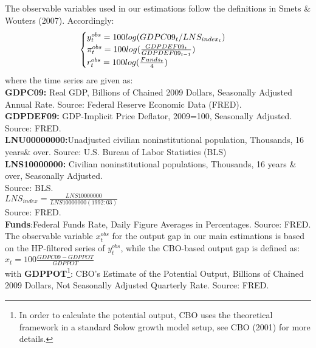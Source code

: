 \begin{appendix}
The observable variables used in our estimations follow the definitions in Smets \& Wouters (2007). Accordingly: \\
\begin{equation}
\begin{cases}
y^{obs}_t=100 log({GDPC09_t}/LNS_{index_t})\\ 
\pi^{obs}_t=100 log(\frac{GDPDEF09_t}{GDPDEF09_{t-1}})\\
r^{obs}_t=100 log(\frac{Funds_t}{4})
\end{cases}\\
\label{eqn:a_1}
\end{equation}
where the time series are given as: \\
\textbf{GDPC09:} Real GDP, Billions of Chained 2009 Dollars, Seasonally Adjusted Annual Rate. Source: Federal Reserve Economic Data (FRED).\\
\textbf{GDPDEF09:} GDP-Implicit Price Deflator, 2009=100, Seasonally Adjusted. Source: FRED.\\
\textbf{LNU00000000:}Unadjusted civilian noninstitutional population, Thousands, 16 years\& over. Source: U.S. Bureau of Labor Statistics (BLS)\\
\textbf{LNS10000000:} Civilian noninstitutional populations, Thousands, 16 years \& over, Seasonally Adjusted.\\ Source: BLS. \\
$LNS_{index}=\frac{LNS10000000}{LNS10000000(1992:03)}$\\
Source: FRED.\\
\textbf{Funds}:Federal Funds Rate, Daily Figure Averages in Percentages. Source: FRED.\\ 
The observable variable $x_t^{obs} $ for the output gap in our main estimations is based on the HP-filtered series of $y_t^{obs}$, while the CBO-based output gap is defined as: 
$x_t = 100 \frac{GDPC09-GDPPOT}{GDPPOT}$\\
with \textbf{GDPPOT}\footnote{In order to calculate the potential output, CBO uses the theoretical framework in a standard Solow growth model setup, see CBO (2001) for more details.}: CBO's Estimate of the Potential Output, Billions of Chained 2009 Dollars, Not Seasonally Adjusted Quarterly Rate. Source: FRED.\\ 



\end{appendix}

